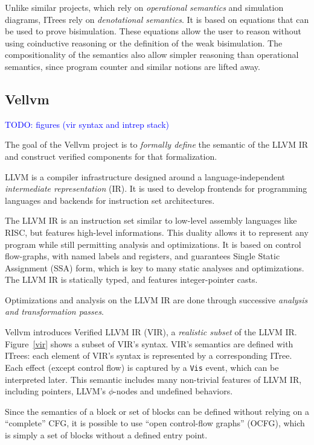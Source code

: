 \documentclass[11pt]{article}
\newcommand{\inlinecoq}[1]{\mbox{\lstinline[style=customcoq,columns=fixed,basewidth=.48em]{#1}}}
\newcommand{\ilc}[1]{\inlinecoq{#1}}
\newcommand{\leon}[1]{\textcolor{blue}{#1}}
\newcommand{\ocfg}{OCFG\xspace}
\begin{document}
Unlike similar projects, which rely on \emph{operational semantics} and simulation diagrams, ITrees rely on \emph{denotational semantics}. It is based on equations that can be used to prove bisimulation. These equations allow the user to reason without using coinductive reasoning or the definition of the weak bisimulation. The compositionality of the semantics also allow simpler reasoning than operational semantics, since program counter and similar notions are lifted away.

\subsection{Vellvm}

\leon{TODO: figures (vir syntax and intrep stack)}

The goal of the Vellvm project is to \emph{formally define} the semantic of the LLVM IR and construct verified components for that formalization.

LLVM is a compiler infrastructure designed around a language-independent \emph{intermediate representation} (IR). It is used to develop frontends for programming languages and backends for instruction set architectures.

The LLVM IR is an instruction set similar to low-level assembly languages like RISC, but features high-level informations. This duality allows it to represent any program while still permitting analysis and optimizations. It is based on control flow-graphs, with named labels and registers, and guarantees Single Static Assignment (SSA) form, which is key to many static analyses and optimizations. The LLVM IR is statically typed, and features integer-pointer casts.

Optimizations and analysis on the LLVM IR are done through successive \emph{analysis and transformation passes}.

Vellvm introduces Verified LLVM IR (VIR), a \emph{realistic subset} of the LLVM IR. Figure~\ref{vir} shows a subset of VIR's syntax. VIR's semantics are defined with ITrees: each element of VIR's syntax is represented by a corresponding ITree. Each effect (except control flow) is captured by a \ilc{Vis} event, which can be interpreted later. This semantic includes many non-trivial features of LLVM IR, including pointers, LLVM's $\phi$-nodes and undefined behaviors.

Since the semantics of a block or set of blocks can be defined without relying on a ``complete'' CFG, it is possible to use ``open control-flow graphs'' (\ocfg), which is simply a set of blocks without a defined entry point.
\end{document}
